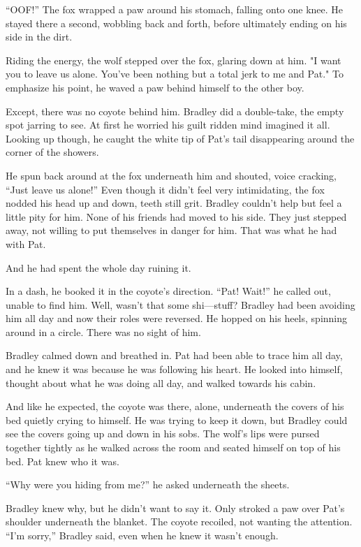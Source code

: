 ``OOF!'' The fox wrapped a paw around his stomach, falling onto one knee.
He stayed there a second, wobbling back and forth, before ultimately
ending on his side in the dirt.

Riding the energy, the wolf stepped over the fox, glaring down at him.
"I want you to leave us alone. You've been nothing but a total jerk to
me and Pat." To emphasize his point, he waved a paw behind himself to
the other boy.

Except, there was no coyote behind him. Bradley did a double-take, the
empty spot jarring to see. At first he worried his guilt ridden mind
imagined it all. Looking up though, he caught the white tip of Pat's
tail disappearing around the corner of the showers.

He spun back around at the fox underneath him and shouted, voice
cracking, ``Just leave us alone!'' Even though it didn't feel very
intimidating, the fox nodded his head up and down, teeth still grit.
Bradley couldn't help but feel a little pity for him. None of his
friends had moved to his side. They just stepped away, not willing to
put themselves in danger for him. That was what he had with Pat.

And he had spent the whole day ruining it.

In a dash, he booked it in the coyote's direction. ``Pat! Wait!'' he
called out, unable to find him. Well, wasn't that some shi---stuff?
Bradley had been avoiding him all day and now their roles were reversed.
He hopped on his heels, spinning around in a circle. There was no sight
of him.

Bradley calmed down and breathed in. Pat had been able to trace him all
day, and he knew it was because he was following his heart. He looked
into himself, thought about what he was doing all day, and walked
towards his cabin.

And like he expected, the coyote was there, alone, underneath the covers
of his bed quietly crying to himself. He was trying to keep it down, but
Bradley could see the covers going up and down in his sobs. The wolf's
lips were pursed together tightly as he walked across the room and
seated himself on top of his bed. Pat knew who it was.

``Why were you hiding from me?'' he asked underneath the sheets.

Bradley knew why, but he didn't want to say it. Only stroked a paw over
Pat's shoulder underneath the blanket. The coyote recoiled, not wanting
the attention. ``I'm sorry,'' Bradley said, even when he knew it wasn't
enough.

